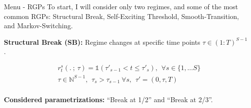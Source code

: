 \documentclass[
  ignorenonframetext,
]{beamer}
\begin{document}
\begin{frame}{Menu - RGPs}
\label{menu---rgps}
To start, I will consider only two regimes, and some of the most common
RGPs: Structural Break, Self-Exciting Threshold, Smooth-Transition, and
Markov-Switching.

\textbf{Structural Break (SB):} Regime changes at specific time points
\(\tau \in (1:T)^{S-1}\).

\begin{equation}
\begin{array}{ll}
    &r^s_t(. ~;~ \tau) = \mathbb{1}(\tau'_{s-1} < t \leq \tau'_s), ~~ \forall s \in \{1, \dots S\}\\
    &\tau \in \mathbb{N}^{S-1}, ~~ \tau_{s} > \tau_{s-1} ~\forall s, ~~ \tau' = (0, \tau, T)\\
\end{array}\tag{RGP-SB}
\end{equation}

\textbf{Considered parametrizations:} ``Break at 1/2'' and ``Break at
2/3''.
\end{frame}

\end{document}
